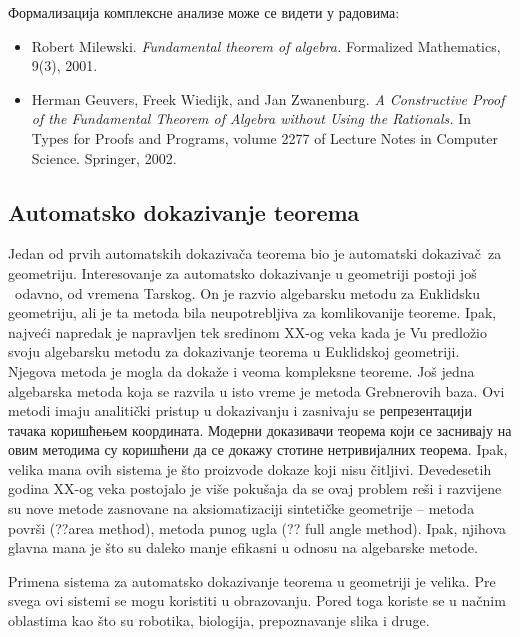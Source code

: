 \documentclass{article}
\begin{document}
Формализација комплексне анализе може се видети у радовима:
\begin{itemize}
\item {\lat Robert Milewski. {\em Fundamental theorem of algebra.} Formalized Mathematics, 9(3), 2001.}

\item {\lat Herman Geuvers, Freek Wiedijk, and Jan Zwanenburg. {\em A Constructive Proof of the
Fundamental Theorem of Algebra without Using the Rationals.} In Types for Proofs and
Programs, volume 2277 of Lecture Notes in Computer Science. Springer, 2002.}
\end{itemize}

\subsection{Automa{t}{s}ko dokazivanje teorema}

Jedan od prvih automa{t}{s}kih dokaziva\v ca teorema bio je automa{t}{s}ki
dokaziva\v c\ za geometriju. Interesovanje za automa{t}{s}ko dokazivanje u
geometriji postoji jo\v s \ odavno, od vremena Tarskog. On je razvio
algebarsku metodu za Euklidsku geometriju, ali je ta metoda bila
neupotrebljiva za komlikovanije teoreme. Ipak, najve\'ci napredak je
napravljen tek sredinom {\lat XX}-og veka kada je Vu predlo\v zio
svoju algebarsku metodu za dokazivanje teorema u Euklidskoj
geometriji. Njegova metoda je mogla da doka\v ze i veoma kompleksne
teoreme. Jo\v s jedna algebarska metoda koja se razvila u isto vreme
je metoda Grebnerovih baza. Ovi metodi imaju analiti\v cki pristup u
dokazivanju i zasnivaju se репрезентацији тачака коришћењем
координата. Модерни доказивачи теорема који се заснивају на овим
методима су коришћени да се докажу стотине нетривијалних
теорема. Ipak, velika mana ovih sistema je \v sto proizvode dokaze
koji nisu \v citljivi. Devedesetih godina {\lat XX}-og veka postojalo
je vi\v se poku\v saja da se ovaj problem re\v si i razvijene su nove
metode zasnovane na aksiomatizaciji sinteti\v cke geometrije -- metoda
povr\v si (??{\lat area method}), metoda punog ugla (?? {\lat full
angle method}). Ipak, njihova glavna mana je \v sto su daleko manje
efikasni u odnosu na algebarske metode.

Primena sistema za automa{t}{s}ko dokazivanje teorema u geometriji je
velika. Pre svega ovi sistemi se mogu koristiti u obrazovanju. Pored
toga koriste se u na\v cnim oblastima kao \v sto su robotika,
biologija, prepoznavanje slika i druge.
\end{document}
